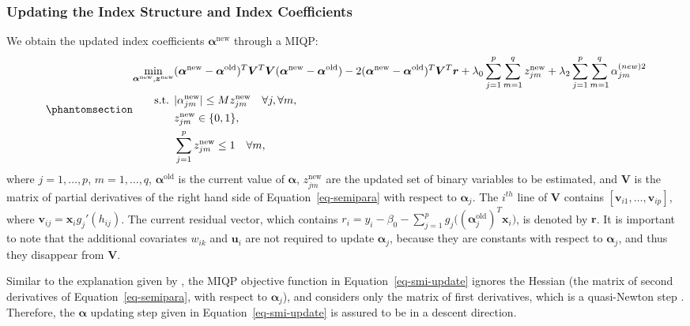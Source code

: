 \documentclass[
  11pt,
  a4paper,
]{article}
\begin{document}
\subsubsection{Updating the Index Structure and Index
Coefficients}\label{sec-step3}

We obtain the updated index coefficients \(\bm{\alpha}^{\text{new}}\)
through a MIQP: \begin{equation}\phantomsection\label{eq-smi-update}{
\begin{aligned}
  \min_{\bm{\alpha}^{\text{new}}, \bm{z}^{\text{new}}} & (\bm{\alpha}^{\text{new}} - \bm{\alpha}^{\text{old}})^{T}\bm{V}^{T}\bm{V}(\bm{\alpha}^{\text{new}} - \bm{\alpha}^{\text{old}}) - 2(\bm{\alpha}^{\text{new}} - \bm{\alpha}^{\text{old}})^{T}\bm{V}^{T}\bm{r} + \lambda_{0}\sum_{j = 1}^{p}\sum_{m = 1}^{q}z_{jm}^{\text{new}} + \lambda_{2}\sum_{j = 1}^{p}\sum_{m = 1}^{q}\alpha_{jm}^{(new)2} \\
  \text{s.t. } & |\alpha_{jm}^{\text{new}}| \le Mz_{jm}^{\text{new}} \quad \forall j, \forall m,\\
  & z_{jm}^{\text{new}} \in \{0, 1\}, \\
  & \sum_{j = 1}^{p}z_{jm}^{\text{new}} \le 1 \quad \forall m,
\end{aligned}
}\end{equation} where \(j = 1, \dots, p\), \(m = 1, \dots, q\),
\(\bm{\alpha}^{\text{old}}\) is the current value of \(\bm{\alpha}\),
\(z_{jm}^{\text{new}}\) are the updated set of binary variables to be
estimated, and \(\bm{V}\) is the matrix of partial derivatives of the
right hand side of Equation~\ref{eq-semipara} with respect to
\(\bm{\alpha}_{j}\). The \(i^{th}\) line of \(\bm{V}\) contains
\([ \bm{v}_{i1}, \dots, \bm{v}_{ip}]\), where
\(\bm{v}_{ij} = \bm{x}_{i}g_{j}'(h_{ij})\). The current residual vector,
which contains
\(r_{i} = y_{i} - \beta_{0} - \sum_{j = 1}^{p}g_{j}\big((\bm{\alpha}_{j}^{\text{old}})^T\bm{x}_{i}\big)\),
is denoted by \(\bm{r}\). It is important to note that the additional
covariates \(w_{ik}\) and \(\bm{u}_{i}\) are not required to update
\(\bm{\alpha}_{j}\), because they are constants with respect to
\(\bm{\alpha}_{j}\), and thus they disappear from \(\bm{V}\).

Similar to the explanation given by \textcite{Masselot2022}, the MIQP
objective function in Equation~\ref{eq-smi-update} ignores the Hessian
(the matrix of second derivatives of Equation~\ref{eq-semipara}, with
respect to \(\bm{\alpha}_{j}\)), and considers only the matrix of first
derivatives, which is a quasi-Newton step \autocite{Peng2022}.
Therefore, the \(\bm{\alpha}\) updating step given in
Equation~\ref{eq-smi-update} is assured to be in a descent direction.
\end{document}
